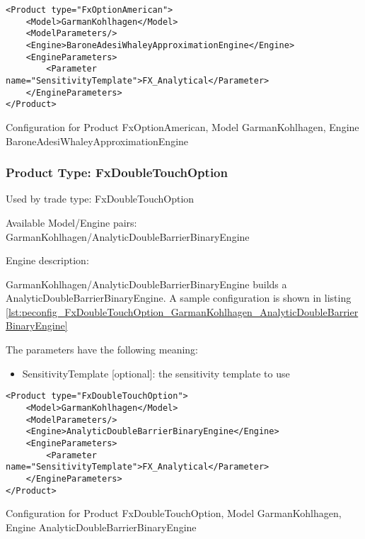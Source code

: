 \begin{longlisting}
\begin{verbatim}
<Product type="FxOptionAmerican">
    <Model>GarmanKohlhagen</Model>
    <ModelParameters/>
    <Engine>BaroneAdesiWhaleyApproximationEngine</Engine>
    <EngineParameters>
        <Parameter name="SensitivityTemplate">FX_Analytical</Parameter>
    </EngineParameters>
</Product>
\end{verbatim}
\caption{Configuration for Product FxOptionAmerican, Model GarmanKohlhagen, Engine BaroneAdesiWhaleyApproximationEngine}
\label{lst:peconfig_FxOptionAmerican_GarmanKohlhagen_BaroneAdesiWhaleyApproximationEngine}
\end{longlisting}

\subsubsection{Product Type: FxDoubleTouchOption}

Used by trade type: FxDoubleTouchOption

Available Model/Engine pairs: GarmanKohlhagen/AnalyticDoubleBarrierBinaryEngine

Engine description:

GarmanKohlhagen/AnalyticDoubleBarrierBinaryEngine builds a AnalyticDoubleBarrierBinaryEngine. A sample configuration is
shown in listing \ref{lst:peconfig_FxDoubleTouchOption_GarmanKohlhagen_AnalyticDoubleBarrierBinaryEngine}

The parameters have the following meaning:

\begin{itemize}
\item SensitivityTemplate [optional]: the sensitivity template to use 
\end{itemize}

\begin{longlisting}
\begin{verbatim}
<Product type="FxDoubleTouchOption">
    <Model>GarmanKohlhagen</Model>
    <ModelParameters/>
    <Engine>AnalyticDoubleBarrierBinaryEngine</Engine>
    <EngineParameters>
        <Parameter name="SensitivityTemplate">FX_Analytical</Parameter>
    </EngineParameters>
</Product>
\end{verbatim}
\caption{Configuration for Product FxDoubleTouchOption, Model GarmanKohlhagen, Engine AnalyticDoubleBarrierBinaryEngine}
\label{lst:peconfig_FxDoubleTouchOption_GarmanKohlhagen_AnalyticDoubleBarrierBinaryEngine}
\end{longlisting}

